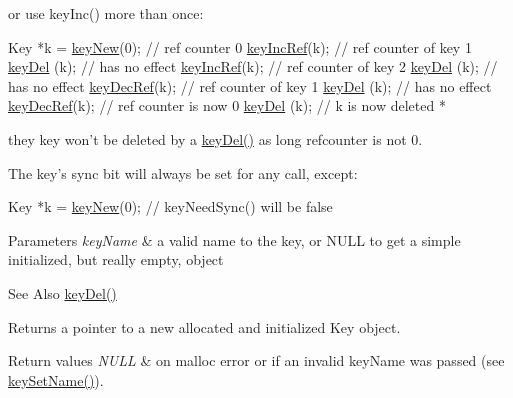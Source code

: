 or use key\-Inc() more than once\-:


\begin{DoxyCode}
Key *k = \hyperlink{group__key_gaf6893c038b3ebee90c73a9ea8356bebf}{keyNew}(0); \textcolor{comment}{// ref counter 0}
\hyperlink{group__key_ga6970a6f254d67af7e39f8e469bb162f1}{keyIncRef}(k); \textcolor{comment}{// ref counter of key 1}
\hyperlink{group__key_ga3df95bbc2494e3e6703ece5639be5bb1}{keyDel} (k);   \textcolor{comment}{// has no effect}
\hyperlink{group__key_ga6970a6f254d67af7e39f8e469bb162f1}{keyIncRef}(k); \textcolor{comment}{// ref counter of key 2}
\hyperlink{group__key_ga3df95bbc2494e3e6703ece5639be5bb1}{keyDel} (k);   \textcolor{comment}{// has no effect}
\hyperlink{group__key_ga2c6433ca22109e4e141946057eccb283}{keyDecRef}(k); \textcolor{comment}{// ref counter of key 1}
\hyperlink{group__key_ga3df95bbc2494e3e6703ece5639be5bb1}{keyDel} (k);   \textcolor{comment}{// has no effect}
\hyperlink{group__key_ga2c6433ca22109e4e141946057eccb283}{keyDecRef}(k); \textcolor{comment}{// ref counter is now 0}
\hyperlink{group__key_ga3df95bbc2494e3e6703ece5639be5bb1}{keyDel} (k); \textcolor{comment}{// k is now deleted}
 *
\end{DoxyCode}


they key won't be deleted by a \hyperlink{group__key_ga3df95bbc2494e3e6703ece5639be5bb1}{key\-Del()} as long refcounter is not 0.

The key's sync bit will always be set for any call, except\-: 
\begin{DoxyCode}
Key *k = \hyperlink{group__key_gaf6893c038b3ebee90c73a9ea8356bebf}{keyNew}(0);
\textcolor{comment}{// keyNeedSync() will be false}
\end{DoxyCode}



\begin{DoxyParams}{Parameters}
{\em key\-Name} & a valid name to the key, or N\-U\-L\-L to get a simple initialized, but really empty, object \\
\hline
\end{DoxyParams}
\begin{DoxySeeAlso}{See Also}
\hyperlink{group__key_ga3df95bbc2494e3e6703ece5639be5bb1}{key\-Del()} 
\end{DoxySeeAlso}
\begin{DoxyReturn}{Returns}
a pointer to a new allocated and initialized Key object. 
\end{DoxyReturn}

\begin{DoxyRetVals}{Return values}
{\em N\-U\-L\-L} & on malloc error or if an invalid {\ttfamily key\-Name} was passed (see \hyperlink{group__keyname_ga7699091610e7f3f43d2949514a4b35d9}{key\-Set\-Name()}). \\
\hline
\end{DoxyRetVals}
